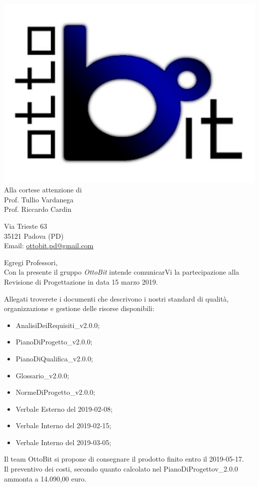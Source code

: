 \documentclass[11pt,a4paper]{article}
\begin{document}
	\noindent\begin{minipage}{0.3\textwidth}
	\includegraphics[scale=0.3]{images/logo.png}\\
		Alla cortese attenzione di\\
		Prof. Tullio Vardanega\\
		Prof. Riccardo Cardin
	\end{minipage}
	\hfill
	\begin{minipage}{0.3\textwidth}\raggedleft
		Via Trieste 63\\
		35121 Padova (PD)\\
		Email:  \href{mailto:ottobit.pd@gmail.com}{ottobit.pd@gmail.com}
	\end{minipage}


\vspace{4em}%


\begin{minipage}{0.95\textwidth}
Egregi Professori,\\
Con la presente il gruppo \textit{OttoBit} intende comunicarVi la partecipazione alla Revisione di Progettazione in data 15 marzo 2019.

Allegati troverete i documenti che descrivono i nostri standard di qualità, organizzazione e gestione delle risorse disponibili:

\begin{itemize}
	\item AnalisiDeiRequisiti\_v2.0.0;
	\item PianoDiProgetto\_v2.0.0;
	\item PianoDiQualifica\_v2.0.0;
	\item Glossario\_v2.0.0;
	\item NormeDiProgetto\_v2.0.0;
	\item Verbale Esterno del 2019-02-08;
	\item Verbale Interno del 2019-02-15;
	\item Verbale Interno del 2019-03-05;
\end{itemize}

Il team OttoBit si propone di consegnare il prodotto finito entro il 2019-05-17.\\
Il preventivo dei costi, secondo quanto calcolato nel PianoDiProgettov\_2.0.0 ammonta a 14.090,00 euro.

\end{minipage}
\end{document}
